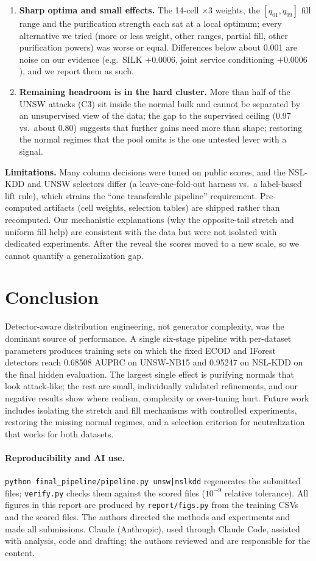 \documentclass[10pt,a4paper]{article}
\begin{document}
\begin{enumerate}[label=\textbf{L\arabic*.},leftmargin=2.0em]
\item \textbf{Sharp optima and small effects.} The 14-cell $\times3$ weights, the $[q_{01},q_{99}]$ fill range and the purification strength each sat at a local optimum; every alternative we tried (more or less weight, other ranges, partial fill, other purification powers) was worse or equal. Differences below about 0.001 are noise on our evidence (e.g.\ SILK $+0.0006$, joint service conditioning $+0.0006$), and we report them as such.
\item \textbf{Remaining headroom is in the hard cluster.} More than half of the UNSW attacks (C3) sit inside the normal bulk and cannot be separated by an unsupervised view of the data; the gap to the supervised ceiling (0.97 vs.\ about 0.80) suggests that further gains need more than shape; restoring the normal regimes that the pool omits is the one untested lever with a signal.
\end{enumerate}

\textbf{Limitations.} Many column decisions were tuned on public scores, and the NSL-KDD and UNSW selectors differ (a leave-one-fold-out harness vs.\ a label-based lift rule), which strains the ``one transferable pipeline'' requirement. Pre-computed artifacts (cell weights, selection tables) are shipped rather than recomputed. Our mechanistic explanations (why the opposite-tail stretch and uniform fill help) are consistent with the data but were not isolated with dedicated experiments. After the reveal the scores moved to a new scale, so we cannot quantify a generalization gap.

\section{Conclusion}
Detector-aware distribution engineering, not generator complexity, was the dominant source of performance. A single six-stage pipeline with per-dataset parameters produces training sets on which the fixed ECOD and IForest detectors reach 0.68508 AUPRC on UNSW-NB15 and 0.95247 on NSL-KDD on the final hidden evaluation. The largest single effect is purifying normals that look attack-like; the rest are small, individually validated refinements, and our negative results show where realism, complexity or over-tuning hurt. Future work includes isolating the stretch and fill mechanisms with controlled experiments, restoring the missing normal regimes, and a selection criterion for neutralization that works for both datasets.

\paragraph{Reproducibility and AI use.} \texttt{python final\_pipeline/pipeline.py unsw|nslkdd} regenerates the submitted files; \texttt{verify.py} checks them against the scored files ($10^{-9}$ relative tolerance). All figures in this report are produced by \texttt{report/figs.py} from the training CSVs and the scored files. The authors directed the methods and experiments and made all submissions. Claude (Anthropic), used through Claude Code, assisted with analysis, code and drafting; the authors reviewed and are responsible for the content.
\end{document}
